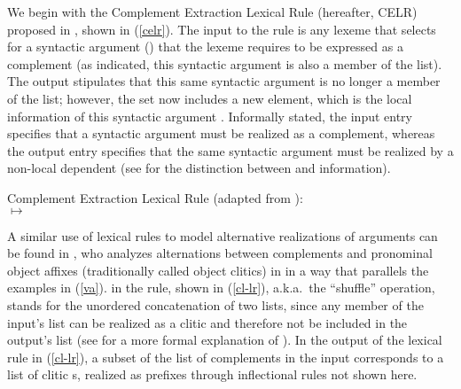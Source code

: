 \documentclass[output=paper,biblatex,babelshorthands,newtxmath,draftmode,colorlinks,citecolor=brown]{langscibook}
\begin{document}
\largerpage
We begin with the Complement Extraction Lexical Rule (hereafter, CELR) proposed in , shown in (\ref{celr}). The input to the rule is any lexeme that selects for
a syntactic argument () that the lexeme requires to be expressed as a complement (as
indicated, this syntactic argument is also a member of the  list). The output
stipulates that this same syntactic argument is no longer a member of the  list;
however, the  set now includes a new element, which is the local information of this
syntactic argument . Informally stated, the input entry specifies that a syntactic argument
must be realized as a complement, whereas the output entry specifies that the same syntactic
argument must be realized by a non-local dependent (see \citealt[Chapter~4]{PollardandSag1994} for
the distinction between  and  information).

\ea
Complement Extraction Lexical Rule (adapted from \citealt[]{PollardandSag1994}):\\
\label{celr}
	$\mapsto$
\z


A similar use of lexical rules to model alternative realizations of arguments can be found in
, who analyzes alternations between
complements and pronominal object affixes (traditionally called object clitics) in  in
a way that parallels the  examples in (\ref{va}). \shuffle\is{$\bigcirc$} in the rule,
shown in (\ref{cl-lr}), a.k.a.\ the ``shuffle'' operation, stands for the unordered
concatenation of two lists, since any member of the input's  list can be realized as a
clitic and therefore not be included in the output's  list (see
\crossrefchaptert[\pageref{rel-shuffle}]{order} for a more formal explanation of \shuffle). In the
output of the lexical rule in (\ref{cl-lr}), a subset of the list of complements in the input
 corresponds to a list of clitic s, realized as prefixes through inflectional
rules not shown here.
\end{document}
